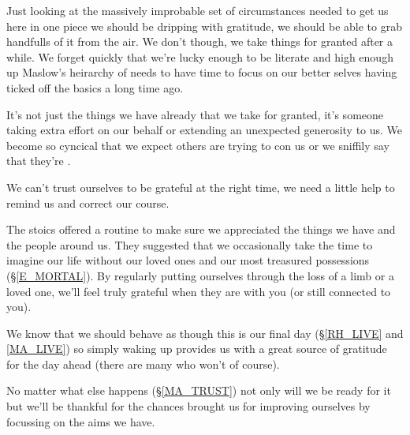 \cleartorightpage
{\small

Just looking at the massively improbable set of circumstances needed to get us here in one piece we should be dripping with gratitude, we should be able to grab handfulls of it from the air. We don't though, we take things for granted after a while. We forget quickly that we're lucky enough to be literate and high enough up Maslow's heirarchy of needs to have time to focus on our better selves having ticked off the basics a long time ago. 

It's not just the things we have already that we take for granted, it's someone taking extra effort on our behalf or extending an unexpected generosity to us. We become so cyncical that we expect others are trying to con us or we sniffily say that they're .

We can't trust ourselves to be  grateful at the right time, we need a little help to remind us and correct our course.

The stoics offered a routine to make sure we appreciated the things we have and the people around us. They suggested that we occasionally take the time to imagine our life without our loved ones and our most treasured possessions (\S \ref{E_MORTAL}). By regularly putting ourselves through the loss of a limb or a loved one, we'll feel truly grateful when they are with you (or still connected to you).

We know that we should behave as though this is our final day (\S \ref{RH_LIVE} and \ref{MA_LIVE}) so simply waking up provides us with a great source of gratitude for the day ahead (there are many who won't of course). 

No matter what else happens (\S \ref{MA_TRUST}) not only will we be ready for it but we'll be thankful for the chances brought us for improving ourselves by focussing on the aims we have.

}
